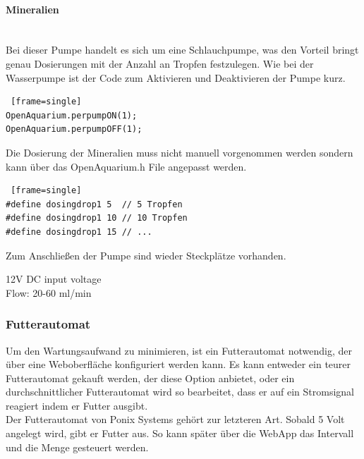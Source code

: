 \paragraph{Mineralien}\mbox{} \\
Bei dieser Pumpe handelt es sich um eine Schlauchpumpe, was den Vorteil bringt genau Dosierungen mit der Anzahl an Tropfen festzulegen. 
Wie bei der Wasserpumpe ist der Code zum Aktivieren und Deaktivieren der Pumpe kurz.
\begin{lstlisting} [frame=single]
OpenAquarium.perpumpON(1); 
OpenAquarium.perpumpOFF(1);
\end{lstlisting}
Die Dosierung der Mineralien muss nicht manuell vorgenommen werden sondern kann über das OpenAquarium.h File angepasst werden. 
\begin{lstlisting} [frame=single]
#define dosingdrop1 5  // 5 Tropfen
#define dosingdrop1 10 // 10 Tropfen
#define dosingdrop1 15 // ...
\end{lstlisting}
Zum Anschließen der Pumpe sind wieder Steckplätze vorhanden. \\
\begin{minipage}{5in}
  \centering
\end{minipage} 
12V DC input voltage \\
Flow: 20-60 ml/min
\newpage

\subsubsection{Futterautomat}
Um den Wartungsaufwand zu minimieren, ist ein Futterautomat notwendig, der \"uber eine Weboberfl\"ache konfiguriert werden kann. Es kann entweder ein teurer Futterautomat gekauft werden, der diese Option anbietet, oder ein durchschnittlicher Futterautomat wird so bearbeitet, dass er auf ein Stromsignal reagiert indem er Futter ausgibt. \\
Der Futterautomat von Ponix Systems geh\"ort zur letzteren Art. Sobald 5 Volt angelegt wird, gibt er Futter aus. So kann sp\"ater \"uber die WebApp das Intervall und die Menge gesteuert werden.
